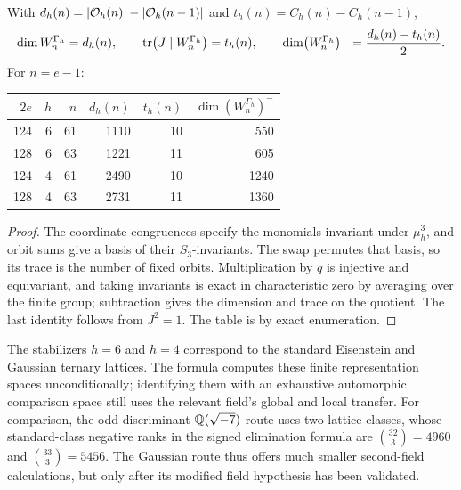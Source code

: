\begin{proposition}\label{sel:prop:orbitdim}
With $d_h(n)=\lvert\mathcal O_h(n)\rvert-\lvert\mathcal O_h(n-1)\rvert$ and
$t_h(n)=C_h(n)-C_h(n-1)$,
\[
 \dim W_n^{\Gamma_h}=d_h(n),\qquad
 \operatorname{tr}\bigl(J\mid W_n^{\Gamma_h}\bigr)=t_h(n),\qquad
 \dim\bigl(W_n^{\Gamma_h}\bigr)^-=\frac{d_h(n)-t_h(n)}2 .
\]
For $n=e-1$:
\begin{center}
\begin{tabular}{@{}rrrrrr@{}}
\toprule
$2e$ & $h$ & $n$ & $d_h(n)$ & $t_h(n)$ & $\dim(W_n^{\Gamma_h})^-$\\
\midrule
124&6&61&1110&10&550\\
128&6&63&1221&11&605\\
124&4&61&2490&10&1240\\
128&4&63&2731&11&1360\\
\bottomrule
\end{tabular}
\end{center}
\end{proposition}

\begin{proof}
The coordinate congruences specify the monomials invariant under
$\mu_h^3$, and orbit sums give a basis of their $S_3$-invariants. The swap
permutes that basis, so its trace is the number of fixed orbits.
Multiplication by $q$ is injective and equivariant, and taking invariants
is exact in characteristic zero by averaging over the finite group;
subtraction gives the dimension and trace on the quotient. The last
identity follows from $J^2=1$. The table is by exact enumeration.
\end{proof}

The stabilizers $h=6$ and $h=4$ correspond to the standard Eisenstein and
Gaussian ternary lattices. The formula computes these finite representation
spaces unconditionally; identifying them with an exhaustive automorphic
comparison space still uses the relevant field's global and local transfer.
For comparison, the odd-discriminant $\mathbb{Q}(\sqrt{-7})$ route uses two lattice
classes, whose standard-class negative ranks in the signed elimination
formula are $\binom{32}{3}=4960$ and $\binom{33}{3}=5456$. The Gaussian
route thus offers much smaller second-field calculations, but only after
its modified field hypothesis has been validated.

